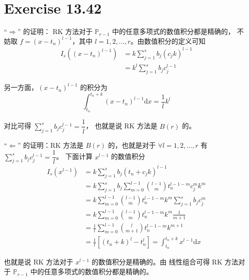 \documentclass[a4paper]{article}
\begin{document}
\section*{Exercise 13.42}

\par “$\Rightarrow$” 的证明：
RK 方法对于 $\mathbb{P}_{r-1}$ 中的任意多项式的数值积分都是精确的，
不妨取 $f=(x - t_n)^{l-1}$，其中 $l = 1,2,\ldots,r$。由数值积分的定义可知
\begin{equation}
    \begin{aligned}
        I_s((x-t_n)^{l-1})
        &=k\sum_{j=1}^{s} b_j \left(c_j k \right)^{l-1}\\
        &=k^l \sum_{j=1}^{s} b_j c_j^{l-1}
    \end{aligned}
\end{equation}
\par 另一方面，$(x-t_n)^{l-1}$ 的积分为
\begin{equation}
    \int_{t_n}^{t_n+k} (x-t_n)^{l-1} \text{d}x = \frac{1}{l} k^l
\end{equation}
\par 对比可得 $\displaystyle\sum_{j=1}^{s} b_j c_j^{l-1} = \dfrac{1}{l}$，
也就是说 RK 方法是 $B(r)$ 的。

\par “$\Leftarrow$” 的证明：RK 方法是 $B(r)$ 的，也就是对于
$\forall l = 1,2,\ldots,r$ 有 
$\displaystyle\sum_{j=1}^{s} b_j c_j^{l-1} = \dfrac{1}{l}$。
下面计算 $x^{l-1}$ 的数值积分
\begin{equation}
    \begin{aligned}
        I_s(x^{l-1})&=
        k\sum_{j=1}^{s} b_j \left( t_n + c_j k \right)^{l-1}\\
        &=
        k\sum_{j=1}^{s} b_j \sum_{m=0}^{l-1} \binom{l-1}{m} t_n^{l-1-m} c_j^m k^m\\
        &=
        k\sum_{m=0}^{l-1} \binom{l-1}{m} t_n^{l-1-m} k^m \sum_{j=1}^{s} b_j c_j^m\\
        &=
        k\sum_{m=0}^{l-1} \binom{l-1}{m} t_n^{l-1-m} k^m \frac{1}{m+1}\\
        &=\frac{1}{l}\sum_{m=0}^{l-1} \binom{l}{m+1} t_n^{l-1-m} k^{m+1}\\
        &=\frac{1}{l}\left[
            (t_n+k)^l - t_n^l
        \right]
        =\int_{t_n}^{t_{n}+k} x^{l-1} \text{d}x
    \end{aligned}
\end{equation}
\par 也就是说 RK 方法对于 $x^{l-1}$ 的数值积分是精确的。由
线性组合可得 RK 方法对于 $\mathbb{P}_{r-1}$ 中的任意多项式的数值积分都是精确的。
\end{document}
